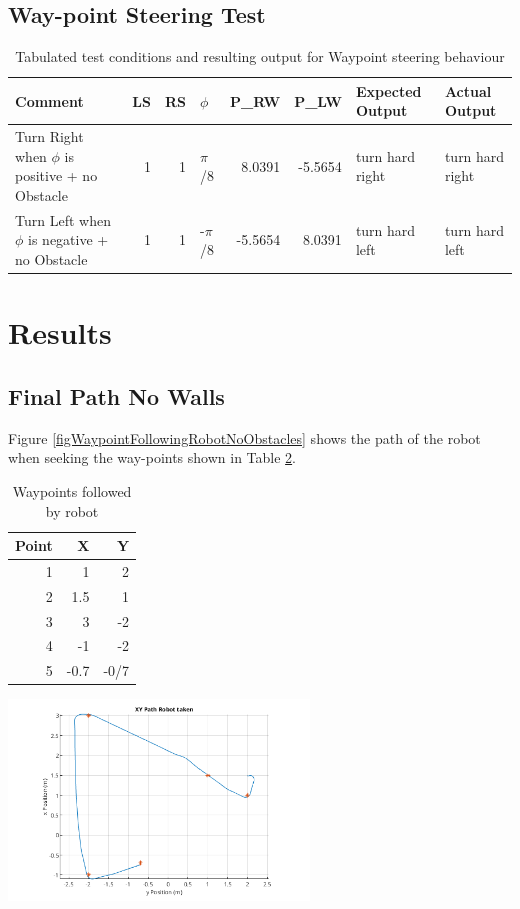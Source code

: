 \documentclass[11pt]{article}
\numberwithin{equation}{section}
\begin{document}
\subsection{Way-point Steering Test}
\label{sec:orgad1bab9}
\begin{table}[H]
\caption{\label{tabWPAvoidanceTests}Tabulated test conditions and resulting output for Waypoint steering behaviour}
\centering
\tiny
\begin{tabular}{lrrlrrll}
\toprule
Comment & LS & RS & \(\phi\) & P\_RW & P\_LW & Expected Output & Actual Output\\
\midrule
Turn Right when \(\phi\) is positive + no Obstacle & 1 & 1 & \(\pi\)/8 & 8.0391 & -5.5654 & turn hard right & turn hard right\\
Turn Left when \(\phi\) is negative + no Obstacle & 1 & 1 & -\(\pi\)/8 & -5.5654 & 8.0391 & turn hard left & turn hard left\\
\bottomrule
\end{tabular}
\end{table}

\section{Results}
\label{sec:org5ce204a}
\subsection{Final Path No Walls}
\label{sec:org88d3e44}
Figure \ref{figWaypointFollowingRobotNoObstacles} shows the path of the robot when seeking the way-points shown in Table \ref{tabWaypointsFollowed}.

\begin{table}[H]
\caption{\label{tabWaypointsFollowed}Waypoints followed by robot}
\centering
\begin{tabular}{rrr}
\toprule
Point & X & Y\\
\midrule
1 & 1 & 2\\
2 & 1.5 & 1\\
3 & 3 & -2\\
4 & -1 & -2\\
5 & -0.7 & -0/7\\
\bottomrule
\end{tabular}
\end{table}

\begin{center}
\includegraphics[width=0.6\textwidth]{Section3/Figures/FinalFigures/xVyCustom_HomingWP_Task1nowalls.png}
\end{center}
\end{document}
